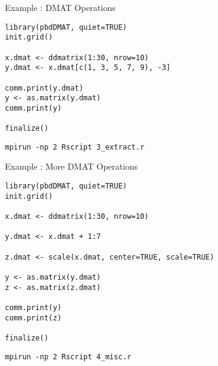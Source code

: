 \begin{frame}[fragile]
  \begin{exampleblock}{Example \countex:  DMAT Operations}\pause
\begin{lstlisting}[title=Generate locally only what is needed]
library(pbdDMAT, quiet=TRUE)
init.grid()

x.dmat <- ddmatrix(1:30, nrow=10)
y.dmat <- x.dmat[c(1, 3, 5, 7, 9), -3]

comm.print(y.dmat)
y <- as.matrix(y.dmat)
comm.print(y)

finalize()
\end{lstlisting}
\begin{lstlisting}[basicstyle=\tiny,backgroundcolor=\color{white},keywordstyle=\color{black},
title=\fontsize{6pt}{7.2}\selectfont Execute this script via:]
mpirun -np 2 Rscript 3_extract.r
\end{lstlisting} 
  \end{exampleblock}
\end{frame}



\begin{frame}[fragile]
  \begin{exampleblock}{Example \countex:  More DMAT Operations}\pause
\begin{lstlisting}
library(pbdDMAT, quiet=TRUE)
init.grid()

x.dmat <- ddmatrix(1:30, nrow=10)

y.dmat <- x.dmat + 1:7

z.dmat <- scale(x.dmat, center=TRUE, scale=TRUE)

y <- as.matrix(y.dmat)
z <- as.matrix(z.dmat)

comm.print(y)
comm.print(z)

finalize()
\end{lstlisting}
\begin{lstlisting}[basicstyle=\tiny,backgroundcolor=\color{white},keywordstyle=\color{black},
title=\fontsize{6pt}{7.2}\selectfont Execute this script via:]
mpirun -np 2 Rscript 4_misc.r
\end{lstlisting} 
  \end{exampleblock}
\end{frame}




